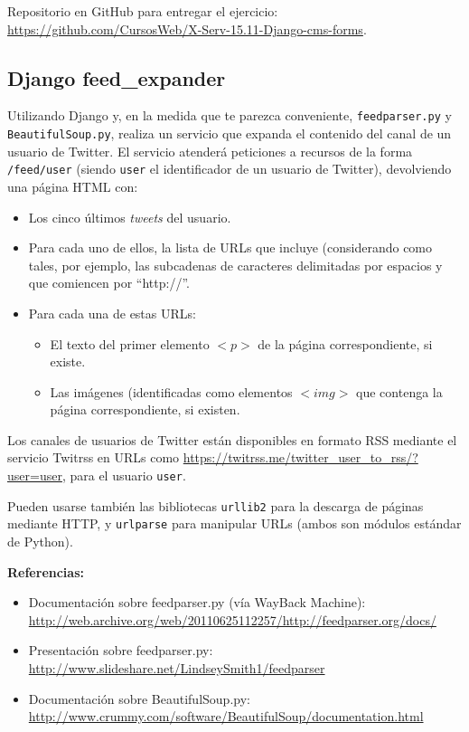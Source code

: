 Repositorio en GitHub para entregar el ejercicio: \\ 
\url{https://github.com/CursosWeb/X-Serv-15.11-Django-cms-forms}.


\subsection{Django feed\_expander}
\label{subsec:django-feed-expander}

Utilizando Django y, en la medida que te parezca conveniente, \texttt{feedparser.py} y \texttt{BeautifulSoup.py}, realiza un servicio que expanda el contenido del canal de un usuario de Twitter. El servicio atenderá peticiones a recursos de la forma \verb|/feed/user| (siendo  \texttt{user} el identificador de un usuario de Twitter), devolviendo una página HTML con:

\begin{itemize}
\item Los cinco últimos \emph{tweets} del usuario.
\item Para cada uno de ellos, la lista de URLs que incluye (considerando como tales, por ejemplo, las subcadenas de caracteres delimitadas por espacios y que comiencen por ``http://''.
\item Para cada una de estas URLs:
  \begin{itemize}
  \item El texto del primer elemento $<p>$ de la página correspondiente, si existe.
  \item Las imágenes (identificadas como elementos $<img>$ que contenga la página correspondiente, si existen.
  \end{itemize}
\end{itemize}

Los canales de usuarios de Twitter están disponibles en formato RSS mediante el servicio Twitrss en URLs como \url{https://twitrss.me/twitter_user_to_rss/?user=user}, para el usuario \texttt{user}.

Pueden usarse también las bibliotecas \texttt{urllib2} para la descarga de páginas mediante HTTP, y \texttt{urlparse} para manipular URLs (ambos son módulos estándar de Python).

\textbf{Referencias:}

\begin{itemize}
\item Documentación sobre feedparser.py (vía WayBack Machine): \\
  \url{http://web.archive.org/web/20110625112257/http://feedparser.org/docs/}
\item Presentación sobre feedparser.py: \\
  \url{http://www.slideshare.net/LindseySmith1/feedparser}
\item Documentación sobre BeautifulSoup.py: \\
  \url{http://www.crummy.com/software/BeautifulSoup/documentation.html}
\end{itemize}


